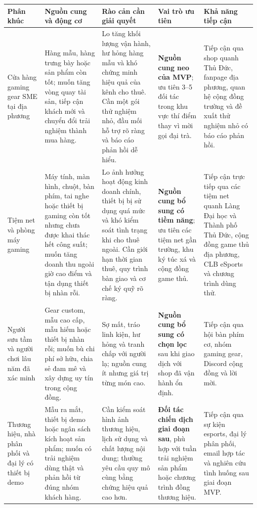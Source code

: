 \begin{longtable}{@{}p{}p{}p{}p{}p{}@{}}
\toprule
\textbf{Phân khúc} & \textbf{Nguồn cung và động cơ} & \textbf{Rào cản cần giải quyết} & \textbf{Vai trò ưu tiên} & \textbf{Khả năng tiếp cận} \\
\midrule
\endhead
Cửa hàng gaming gear SME tại địa phương & Hàng mẫu, hàng trưng bày hoặc sản phẩm còn tốt; muốn tăng vòng quay tài sản, tiếp cận khách mới và chuyển đổi trải nghiệm thành mua hàng. & Lo tăng khối lượng vận hành, hư hỏng hàng mẫu và khó chứng minh hiệu quả của kênh cho thuê. Cần một gói thử nghiệm nhỏ, đầu mối hỗ trợ rõ ràng và báo cáo phản hồi dễ hiểu. & \textbf{Nguồn cung neo của MVP}; ưu tiên 3--5 đối tác trong khu vực thí điểm thay vì mời gọi đại trà. & Tiếp cận qua shop quanh Thủ Đức, fanpage địa phương, quan hệ cộng đồng trường và đề xuất thử nghiệm nhỏ có báo cáo phản hồi. \\
Tiệm net và phòng máy gaming & Máy tính, màn hình, chuột, bàn phím, tai nghe hoặc thiết bị gaming còn tốt nhưng chưa được khai thác hết công suất; muốn tăng doanh thu ngoài giờ cao điểm và tận dụng thiết bị nhàn rỗi. & Lo ảnh hưởng hoạt động kinh doanh chính, thiết bị bị sử dụng quá mức và khó kiểm soát tình trạng khi cho thuê ngoài. Cần giới hạn thời gian thuê, quy trình bàn giao và cơ chế ký quỹ rõ ràng. & \textbf{Nguồn cung bổ sung có tiềm năng}; ưu tiên các tiệm net gần trường, khu ký túc xá và cộng đồng game thủ. & Tiếp cận trực tiếp qua các tiệm net quanh Làng Đại học và Thành phố Thủ Đức, cộng đồng game thủ địa phương, CLB eSports và chương trình dùng thử. \\
Người sưu tầm và người chơi lâu năm đã xác minh & Gear custom, mẫu cao cấp, mẫu hiếm hoặc thiết bị nhàn rỗi; muốn bù chi phí sở hữu, chia sẻ đam mê và xây dựng uy tín trong cộng đồng. & Sợ mất, tráo linh kiện, hư hỏng và tranh chấp với người lạ; nguồn cung ít nhưng giá trị từng món cao. & \textbf{Nguồn cung bổ sung có chọn lọc} sau khi giao dịch với shop đã vận hành ổn định. & Tiếp cận qua hội bàn phím cơ, nhóm gaming gear, Discord cộng đồng và lời mời. \\
Thương hiệu, nhà phân phối và đại lý có thiết bị demo & Mẫu ra mắt, thiết bị demo hoặc ngân sách kích hoạt sản phẩm; muốn có trải nghiệm dùng thật và phản hồi từ đúng nhóm khách hàng. & Cần kiểm soát hình ảnh thương hiệu, lịch sử dụng và chất lượng nội dung; thường yêu cầu quy mô cùng bằng chứng hiệu quả cao hơn. & \textbf{Đối tác chiến dịch giai đoạn sau}, phù hợp với tuần trải nghiệm sản phẩm hoặc chương trình đồng thương hiệu. & Tiếp cận qua sự kiện esports, đại lý phân phối, email hợp tác và nghiên cứu tình huống sau giai đoạn MVP. \\
\bottomrule
\end{longtable}

